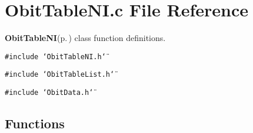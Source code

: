\section{Obit\-Table\-NI.c File Reference}
\label{ObitTableNI_8c}
{\bf Obit\-Table\-NI}{\rm (p.\,\pageref{structObitTableNI})} class function definitions. 

{\tt \#include \char`\"{}Obit\-Table\-NI.h\char`\"{}}\par
{\tt \#include \char`\"{}Obit\-Table\-List.h\char`\"{}}\par
{\tt \#include \char`\"{}Obit\-Data.h\char`\"{}}\par
\subsection*{Functions}
